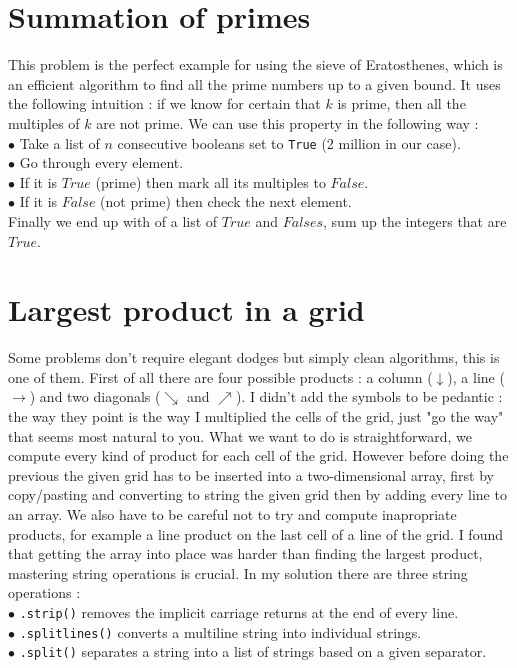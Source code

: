 \documentclass[11pt]{article}
\begin{document}
\section{Summation of primes} 
This problem is the perfect example for using the sieve of Eratosthenes, which is an efficient algorithm to find all the prime numbers up to a given bound. It uses the following intuition : if we know for certain that $k$ is prime, then all the multiples of $k$ are not prime. We can use this property in the following way :
\bigskip 
\\ $\bullet$ Take a list of $n$ consecutive booleans set to \texttt{True} (2 million in our case).
\\ $\bullet$ Go through every element.
\\ $\bullet$ If it is $True$ (prime) then mark all its multiples to $False$.
\\ $\bullet$ If it is $False$ (not prime) then check the next element.
\bigskip
\\Finally we end up with of a list of $True$ and $Falses$, sum up the integers that are $True$.

\section{Largest product in a grid} 
Some problems don't require elegant dodges but simply clean algorithms, this is one of them. First of all there are four possible products : a column ($\downarrow$), a line ($\rightarrow$) and two diagonals ($\searrow$ and $\nearrow$). I didn't add the symbols to be pedantic : the way they point is the way I multiplied the cells of the grid, just "go the way" that seems most natural to you. What we want to do is straightforward, we compute every kind of product for each cell of the grid. However before doing the previous the given grid has to be inserted into a two-dimensional array, first by copy/pasting and converting to string the given grid then by adding every line to an array. We also have to be careful not to try and compute inapropriate products, for example a line product on the last cell of a line of the grid. I found that getting the array into place was harder than finding the largest product, mastering string operations is crucial. In my solution there are three string operations :
\bigskip 
\\ $\bullet$ \texttt{.strip()} removes the implicit carriage returns at the end of every line.
\\ $\bullet$ \texttt{.splitlines()} converts a multiline string into individual strings.
\\ $\bullet$ \texttt{.split()} separates a string into a list of strings based on a given separator. 
\end{document}
